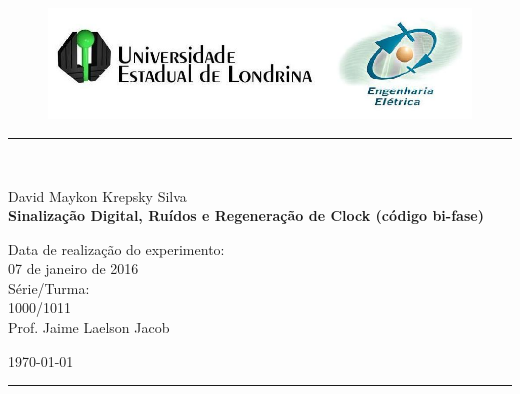 \begin{titlepage}
\begin{center}
\begin{figure}[h]
\includegraphics[scale=0.76]{img/topdotitulo.png}
\end{figure}
\rule{\columnwidth}{1.5mm}
\

\large David Maykon Krepsky Silva	\\

\vspace{4cm}
{\bf \Large Sinalização Digital, Ruídos e Regeneração de Clock	(código bi-fase)}
\vspace{3.5cm}

\begin{flushright}
Data de realização do experimento:\\
07 de janeiro de 2016\\
Série/Turma:\\
1000/1011\\
Prof. Jaime Laelson Jacob
\end{flushright}

\vspace{3.2cm}
\today

\rule{\columnwidth}{1.3mm}
\end{center}
\end{titlepage}